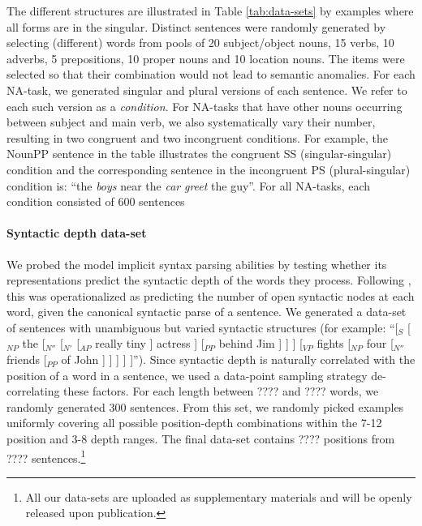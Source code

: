 The different structures are illustrated in Table \ref{tab:data-sets}
by examples where all forms are in the singular. Distinct sentences
were randomly generated by selecting (different) words from pools of
20 subject/object nouns, 15 verbs, 10 adverbs, 5 prepositions, 10
proper nouns and 10 location nouns. The items were selected so that
their combination would not lead to semantic anomalies. For each
NA-task, we generated singular and plural versions of each
sentence. We refer to each such version as a \textit{condition}. For
NA-tasks that have other nouns occurring between subject and main
verb, we also systematically vary their number, resulting in two
congruent and two incongruent conditions. For example, the NounPP
sentence in the table illustrates the congruent SS (singular-singular)
condition and the corresponding sentence in the incongruent PS (plural-singular)
condition is: ``the \emph{boys} near the \emph{car} \emph{greet} the guy''. For all
NA-tasks, each condition consisted of 600 sentences

\paragraph{Syntactic depth data-set} We probed the model implicit syntax parsing abilities by testing whether its representations predict the syntactic depth of the
words they process. Following , this was
operationalized as predicting the number of open syntactic nodes at
each word, given the canonical syntactic parse of a sentence.  We
generated a data-set of sentences with unambiguous but varied
syntactic structures (for example: ``[$_S$ [$_{NP}$ the [$_{N''}$ [$_{N'}$ [$_{AP}$ really tiny ]  actress  ] [$_{PP}$ behind  Jim  ] ] ] [$_{VP}$ fights [$_{NP}$ four [$_{N''}$ friends [$_{PP}$ of  John ] ] ] ] ]''). Since syntactic depth is naturally correlated with
the position of a word in a sentence, we used a data-point sampling
strategy de-correlating these factors. For each  length between ????
and ???? words, we randomly generated 300 sentences. From this set, we
randomly picked examples uniformly covering all possible
position-depth combinations within the 7-12 position and 3-8
depth ranges.  The final data-set contains ???? positions
from ???? sentences.\footnote{All our data-sets are uploaded as supplementary materials and will be openly released upon publication.}

